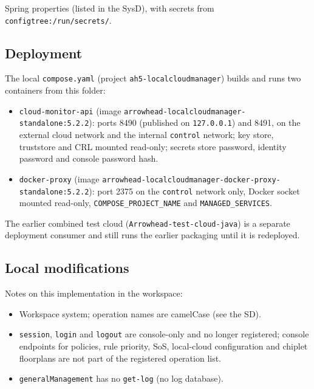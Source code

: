\documentclass[a4paper]{arrowhead}
\begin{document}
Spring properties (listed in the SysD), with secrets from \texttt{configtree:\allowbreak{}/\allowbreak{}run/\allowbreak{}secrets/}.

\subsection{Deployment}

The local \texttt{compose.yaml} (project \texttt{ah5-\allowbreak{}localcloudmanager}) builds and runs two containers from this folder:

\begin{itemize}
\item \texttt{cloud-\allowbreak{}monitor-\allowbreak{}api} (image \texttt{arrowhead-\allowbreak{}localcloudmanager-\allowbreak{}standalone:\allowbreak{}5.2.2}): ports 8490 (published on \texttt{127.0.0.1}) and 8491, on the external cloud network and the internal \texttt{control} network; key store, truststore and CRL mounted read-only; secrets store password, identity password and console password hash.
\item \texttt{docker-\allowbreak{}proxy} (image \texttt{arrowhead-\allowbreak{}localcloudmanager-\allowbreak{}docker-\allowbreak{}proxy-\allowbreak{}standalone:\allowbreak{}5.2.2}): port 2375 on the \texttt{control} network only, Docker socket mounted read-only, \texttt{COMPOSE\_\allowbreak{}PROJECT\_\allowbreak{}NAME} and \texttt{MANAGED\_\allowbreak{}SERVICES}.
\end{itemize}

The earlier combined test cloud (\texttt{Arrowhead-test-cloud-java}) is a separate deployment consumer and still runs the earlier packaging until it is redeployed.

\subsection{Local modifications}
\label{sec:local}

Notes on this implementation in the workspace:
\begin{itemize}
  \item Workspace system; operation names are camelCase (see the SD).
  \item \texttt{session}, \texttt{login} and \texttt{logout} are console-only and no longer registered; console endpoints for policies, rule priority, SoS, local-cloud configuration and chiplet floorplans are not part of the registered operation list.
  \item \texttt{general\allowbreak{}Management} has no \texttt{get-\allowbreak{}log} (no log database).
\end{itemize}
\end{document}
